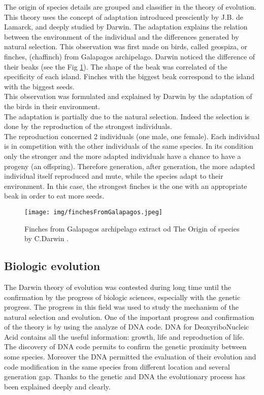 The origin of species details are grouped and classifier in the theory of evolution. 
This theory uses the concept of adaptation introduced presciently by J.B. de Lamarck, and deeply studied by Darwin. The adaptation explains the relation between the environment of the individual and the differences generated by natural selection. This observation was first made on birds, called geospiza, or finches, (chaffinch) from Galapagos archipelago. Darwin noticed the difference of their beaks (see the Fig \ref{fig:finchesFromGalapagos}). The shape of the beak was correlated of the specificity of each island. Finches with the biggest beak correspond to the island with the biggest seeds. \\
This observation was formulated and explained by Darwin by the adaptation of the birds in their environment.\\ The adaptation is partially due to the natural selection. Indeed the selection is done by the reproduction of the strongest individuals.\\
The reproduction concerned 2 individuals (one male, one female). Each individual is in competition with the other individuals of the same species. In its condition only the stronger and  the more adapted individuals   have a chance to have a progeny (an offspring). Therefore generation, after generation, the more adapted individual itself reproduced and mute, while the species adapt to their environment.
In this case, the strongest finches is the one with an appropriate beak in order to eat more seeds. 
\begin{figure}[t!]
   \texttt{[image: img/finchesFromGalapagos.jpeg]}
  \caption{Finches from Galapagos archipelago extract od The Origin of species by C.Darwin .}\label{fig:finchesFromGalapagos}
  \endminipage\hfill
\end{figure}

\subsection{Biologic evolution }\label{subsec:BioEvolv}

The Darwin theory of evolution was contested during long time until the confirmation by the progress of biologic sciences, especially with the genetic progress. The progress in this field was used to study the mechanism of the natural selection and evolution. One of the important progress and confirmation of the theory is by using the analyze of DNA code. DNA for DeoxyriboNucleic Acid contains all the useful information: growth, life and reproduction of life.   \\
The discovery of DNA code permits to confirm the genetic proximity between some species. Moreover the DNA permitted the evaluation of their evolution and code modification in the same species from different location and several generation gap. %
Thanks to the genetic  and DNA the evolutionary process has been explained deeply and clearly. 



